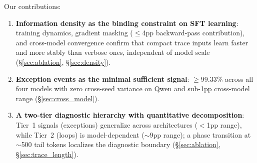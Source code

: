 Our contributions:
\begin{enumerate}
\item \textbf{Information density as the binding constraint on SFT learning}: training dynamics, gradient masking (${\leq}$4pp backward-pass contribution), and cross-model convergence confirm that compact trace inputs learn faster and more stably than verbose ones, independent of model scale (\S\ref{sec:ablation}, \S\ref{sec:density}).
\item \textbf{Exception events as the minimal sufficient signal}: ${\geq}$99.33\% across all four models with zero cross-seed variance on Qwen and sub-1pp cross-model range (\S\ref{sec:cross_model}).
\item \textbf{A two-tier diagnostic hierarchy with quantitative decomposition}: Tier~1 signals (exceptions) generalize across architectures ($<$1pp range), while Tier~2 (loops) is model-dependent (${\sim}$9pp range); a phase transition at ${\sim}$500 tail tokens localizes the diagnostic boundary (\S\ref{sec:ablation}, \S\ref{sec:trace_length}).
\end{enumerate}
